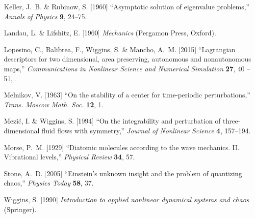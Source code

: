 \documentclass{ws-ijbc}
\begin{document}
\begin{thebibliography}{16}
Keller, J.~B. \& Rubinow, S. [1960] \enquote{Asymptotic solution of eigenvalue
  problems,} \emph{Annals of Physics} \textbf{9},  24--75.

Landau, L. \& Lifshitz, E. [1960] \emph{Mechanics} (Pergamon Press, Oxford).

Lopesino, C., Balibrea, F., Wiggins, S. \& Mancho, A.~M. [2015]
  \enquote{Lagrangian descriptors for two dimensional, area preserving,
  autonomous and nonautonomous maps,} \emph{Communications in Nonlinear Science
  and Numerical Simulation} \textbf{27},  40 -- 51,
  .

Melnikov, V. [1963] \enquote{On the stability of a center for time-periodic
  perturbations,} \emph{Trans. Moscow Math. Soc.} \textbf{12},  1.

Mezi{\'c}, I. \& Wiggins, S. [1994] \enquote{On the integrability and
  perturbation of three-dimensional fluid flows with symmetry,} \emph{Journal
  of Nonlinear Science} \textbf{4},  157--194.

Morse, P.~M. [1929] \enquote{Diatomic molecules according to the wave
  mechanics. {II}. {V}ibrational levels,} \emph{Physical Review} \textbf{34},
  57.

Stone, A.~D. [2005] \enquote{Einstein's unknown insight and the problem of
  quantizing chaos,} \emph{Physics Today} \textbf{58},  37.

Wiggins, S. [1990] \emph{Introduction to applied nonlinear dynamical systems
  and chaos} (Springer).

\end{thebibliography}
\end{document}
